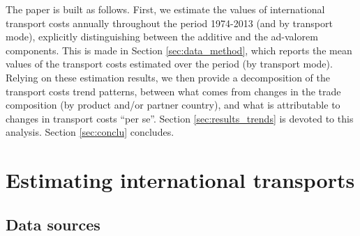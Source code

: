 \documentclass[a4paper,11pt]{article}
\begin{document}

The paper is built as follows. First, we estimate the values of international transport costs annually throughout the period 1974-2013 (and by transport mode), explicitly distinguishing between the additive and the ad-valorem components. This is made in Section \ref{sec:data_method}, which reports the mean values of the transport costs estimated over the period (by transport mode). Relying on these estimation results, we then provide a decomposition of the transport costs trend patterns, between what comes from changes in the trade composition (by product and/or partner country), and what is attributable to changes in transport costs ``per se''. Section \ref{sec:results_trends} is devoted to this analysis. Section \ref{sec:conclu} concludes.


\section{Estimating international transports\label{sec:data_method}}

\subsection{Data sources}
\end{document}
